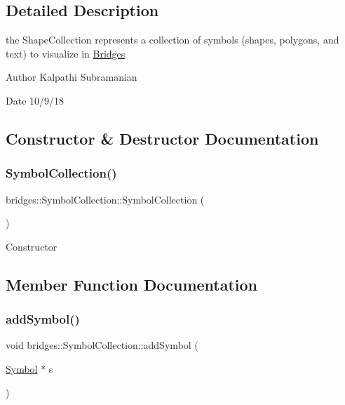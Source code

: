 \subsection{Detailed Description}
the Shape\+Collection represents a collection of symbols (shapes, polygons, and text) to visualize in \mbox{\hyperlink{classbridges_1_1_bridges}{Bridges}} 

\begin{DoxyAuthor}{Author}
Kalpathi Subramanian 
\end{DoxyAuthor}
\begin{DoxyDate}{Date}
10/9/18 
\end{DoxyDate}


\subsection{Constructor \& Destructor Documentation}
\mbox{\label{classbridges_1_1_symbol_collection_ae3b3dd944594e1ebac451c0557a45f80}} 
\subsubsection{\texorpdfstring{Symbol\+Collection()}{SymbolCollection()}}
{\footnotesize\ttfamily bridges\+::\+Symbol\+Collection\+::\+Symbol\+Collection (\begin{DoxyParamCaption}{ }\end{DoxyParamCaption})\hspace{0.3cm}{\ttfamily [inline]}}

Constructor 

\subsection{Member Function Documentation}
\mbox{\label{classbridges_1_1_symbol_collection_acdc101f6651becc430e281ed967ddedf}} 
\subsubsection{\texorpdfstring{add\+Symbol()}{addSymbol()}}
{\footnotesize\ttfamily void bridges\+::\+Symbol\+Collection\+::add\+Symbol (\begin{DoxyParamCaption}\item[{\mbox{\hyperlink{classbridges_1_1_symbol}{Symbol}} $\ast$}]{s }\end{DoxyParamCaption})\hspace{0.3cm}{\ttfamily [inline]}}

